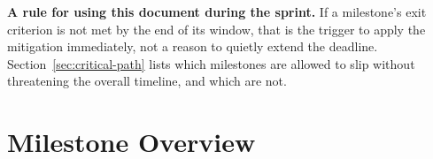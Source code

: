 \documentclass[11pt,a4paper]{article}
\begin{document}
\begin{noteb}
\textbf{A rule for using this document during the sprint.} If a milestone's
exit criterion is not met by the end of its window, that is the trigger to
apply the mitigation immediately, not a reason to quietly extend the
deadline. Section~\ref{sec:critical-path} lists which milestones are allowed
to slip without threatening the overall timeline, and which are not.
\end{noteb}

\section{Milestone Overview}
\end{document}
